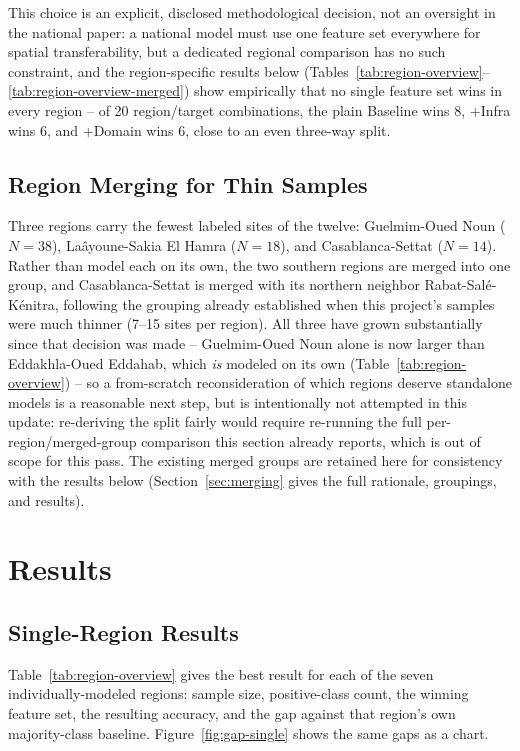 \documentclass[11pt,a4paper]{article}
\begin{document}
This choice is an explicit, disclosed methodological decision, not an oversight in the national paper: a national model must use one feature set everywhere for spatial transferability, but a dedicated regional comparison has no such constraint, and the region-specific results below (Tables~\ref{tab:region-overview}--\ref{tab:region-overview-merged}) show empirically that no single feature set wins in every region -- of 20 region/target combinations, the plain Baseline wins 8, +Infra wins 6, and +Domain wins 6, close to an even three-way split.

\subsection{Region Merging for Thin Samples}
\label{sec:merging-methods}
Three regions carry the fewest labeled sites of the twelve: Guelmim-Oued Noun ($N=38$), Laâyoune-Sakia El Hamra ($N=18$), and Casablanca-Settat ($N=14$). Rather than model each on its own, the two southern regions are merged into one group, and Casablanca-Settat is merged with its northern neighbor Rabat-Salé-Kénitra, following the grouping already established when this project's samples were much thinner (7--15 sites per region). All three have grown substantially since that decision was made -- Guelmim-Oued Noun alone is now larger than Eddakhla-Oued Eddahab, which \emph{is} modeled on its own (Table~\ref{tab:region-overview}) -- so a from-scratch reconsideration of which regions deserve standalone models is a reasonable next step, but is intentionally not attempted in this update: re-deriving the split fairly would require re-running the full per-region/merged-group comparison this section already reports, which is out of scope for this pass. The existing merged groups are retained here for consistency with the results below (Section~\ref{sec:merging} gives the full rationale, groupings, and results).

\section{Results}
\label{sec:results}

\subsection{Single-Region Results}
\label{sec:single-region-results}
Table~\ref{tab:region-overview} gives the best result for each of the seven individually-modeled regions: sample size, positive-class count, the winning feature set, the resulting accuracy, and the gap against that region's own majority-class baseline. Figure~\ref{fig:gap-single} shows the same gaps as a chart.
\end{document}
